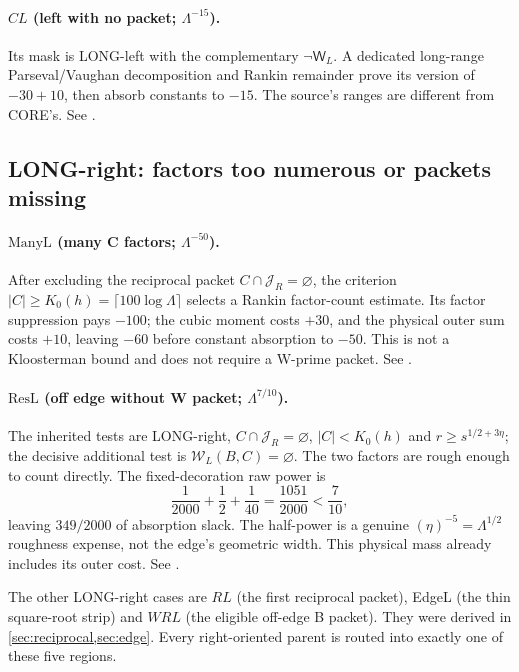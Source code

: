 \documentclass[11pt]{article}
\newcommand{\Lam}{\Lambda}
\newcommand{\JR}{\mathcal J_R}
\theoremstyle{definition}
\theoremstyle{remark}
\newcommand{\1}{\mathbf 1}
\begin{document}
\paragraph{$CL$ (left with no packet; $\Lam^{-15}$).}
Its mask is LONG-left with the complementary
$\neg\mathsf W_L$. A dedicated long-range
Parseval/Vaughan decomposition and Rankin remainder
prove its version of $-30+10$, then absorb constants to
$-15$. The source's ranges are different from CORE's.
See .

\subsection{LONG-right: factors too numerous or packets missing}

\paragraph{$\mathrm{ManyL}$ (many C factors; $\Lam^{-50}$).}
After excluding the reciprocal packet
$C\cap\JR=\varnothing$, the criterion
$|C|\ge K_0(h)=\lceil100\log\Lam\rceil$
selects a Rankin factor-count estimate. Its factor
suppression pays $-100$; the cubic moment costs $+30$,
and the physical outer sum costs $+10$, leaving $-60$
before constant absorption to $-50$. This is not a
Kloosterman bound and does not require a W-prime packet.
See .

\paragraph{$\mathrm{ResL}$ (off edge without W packet;
$\Lam^{7/10}$).}
The inherited tests are LONG-right, $C\cap\JR=\varnothing$,
$|C|<K_0(h)$ and $r\ge s^{1/2+3\eta}$; the decisive
additional test is $\mathcal W_L(B,C)=\varnothing$.
The two factors are rough enough to count directly.
The fixed-decoration raw power is
\[
 \frac1{2000}+\frac12+\frac1{40}
  =\frac{1051}{2000}<\frac7{10},
\]
leaving $349/2000$ of absorption slack. The half-power
is a genuine $(\eta)^{-5}=\Lam^{1/2}$ roughness
expense, not the edge's geometric width. This
physical mass already includes its outer cost.
See .

The other LONG-right cases are $RL$ (the first reciprocal
packet), EdgeL (the thin square-root strip) and $WRL$
(the eligible off-edge B packet). They were derived in
\cref{sec:reciprocal,sec:edge}. Every right-oriented
parent is routed into exactly one of these five regions.
\end{document}
